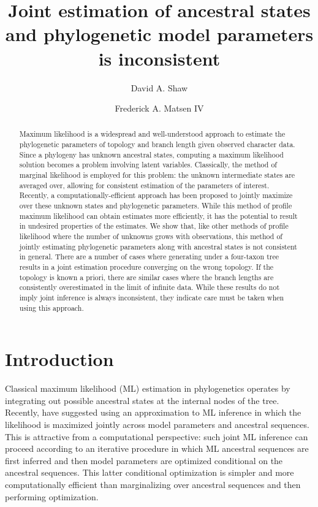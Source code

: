 \documentclass{article}
\title{Joint estimation of ancestral states and phylogenetic model parameters is inconsistent}
\author{David A. Shaw \and Frederick A. Matsen IV}
\begin{document}
\maketitle

\renewcommand{\arraystretch}{1.2} %

\begin{abstract}
Maximum likelihood is a widespread and well-understood approach to estimate the phylogenetic parameters of topology and branch length given observed character data.
Since a phylogeny has unknown ancestral states, computing a maximum likelihood solution becomes a problem involving latent variables.
Classically, the method of marginal likelihood is employed for this problem: the unknown intermediate states are averaged over, allowing for consistent estimation of the parameters of interest.
Recently, a computationally-efficient approach has been proposed to jointly maximize over these unknown states and phylogenetic parameters.
While this method of profile maximum likelihood can obtain estimates more efficiently, it has the potential to result in undesired properties of the estimates.
We show that, like other methods of profile likelihood where the number of unknowns grows with observations, this method of jointly estimating phylogenetic parameters along with ancestral states is not consistent in general.
There are a number of cases where generating under a four-taxon tree results in a joint estimation procedure converging on the wrong topology.
If the topology is known a priori, there are similar cases where the branch lengths are consistently overestimated in the limit of infinite data.
While these results do not imply joint inference is always inconsistent, they indicate care must be taken when using this approach.
\end{abstract}

\section*{Introduction}

Classical maximum likelihood (ML) estimation in phylogenetics operates by integrating out possible ancestral states at the internal nodes of the tree.
Recently, \cite{Sagulenko2017-jo} have suggested using an approximation to ML inference in which the likelihood is maximized jointly across model parameters and ancestral sequences.
This is attractive from a computational perspective: such joint ML inference can proceed according to an iterative procedure in which ML ancestral sequences are first inferred and then model parameters are optimized conditional on the ancestral sequences.
This latter conditional optimization is simpler and more computationally efficient than marginalizing over ancestral sequences and then performing optimization.
\end{document}
